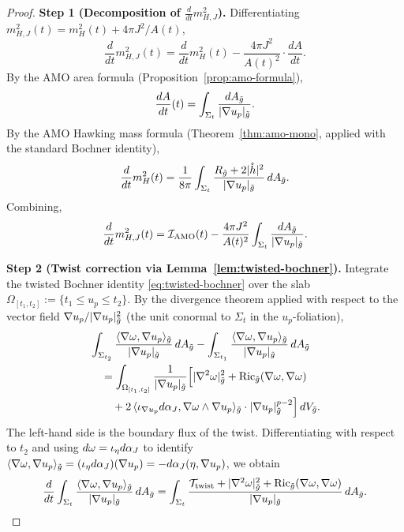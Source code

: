 \begin{proof}
\textbf{Step 1 (Decomposition of $\tfrac{d}{dt} m_{H,J}^2$).} Differentiating $m_{H,J}^2(t) = m_H^2(t) + 4\pi J^2/A(t)$,
\begin{equation}
\frac{d}{dt} m_{H,J}^2(t) = \frac{d}{dt} m_H^2(t) - \frac{4\pi J^2}{A(t)^2} \cdot \frac{dA}{dt}.
\end{equation}
By the AMO area formula (Proposition~\ref{prop:amo-formula}),
\begin{equation}
\frac{dA}{dt}(t) = \int_{\Sigma_t} \frac{dA_{\tilde{g}}}{|\nabla u_p|_{\tilde{g}}}.
\end{equation}
By the AMO Hawking mass formula (Theorem~\ref{thm:amo-mono}, applied with the standard Bochner identity),
\begin{equation}
\frac{d}{dt} m_H^2(t) = \frac{1}{8\pi}\int_{\Sigma_t} \frac{R_{\tilde{g}} + 2|\mathring{h}|^2}{|\nabla u_p|_{\tilde{g}}} \, dA_{\tilde{g}}.
\end{equation}
Combining,
\begin{equation}\label{eq:tbm-decomp}
\frac{d}{dt} m_{H,J}^2(t) = \mathcal{I}_{\mathrm{AMO}}(t) - \frac{4\pi J^2}{A(t)^2} \int_{\Sigma_t} \frac{dA_{\tilde{g}}}{|\nabla u_p|_{\tilde{g}}}.
\end{equation}

\textbf{Step 2 (Twist correction via Lemma~\ref{lem:twisted-bochner}).} Integrate the twisted Bochner identity \eqref{eq:twisted-bochner} over the slab $\Omega_{[t_1, t_2]} := \{t_1 \leq u_p \leq t_2\}$. By the divergence theorem applied with respect to the vector field $\nabla u_p / |\nabla u_p|_{\tilde{g}}^2$ (the unit conormal to $\Sigma_t$ in the $u_p$-foliation),
\begin{equation}\label{eq:tbm-slab}
\begin{aligned}
&\int_{\Sigma_{t_2}} \frac{\langle \nabla \omega, \nabla u_p\rangle_{\tilde{g}}}{|\nabla u_p|_{\tilde{g}}} \, dA_{\tilde{g}} - \int_{\Sigma_{t_1}} \frac{\langle \nabla \omega, \nabla u_p\rangle_{\tilde{g}}}{|\nabla u_p|_{\tilde{g}}} \, dA_{\tilde{g}} \\
&\quad = \int_{\Omega_{[t_1,t_2]}} \frac{1}{|\nabla u_p|_{\tilde{g}}} \Big[ |\nabla^2 \omega|_{\tilde{g}}^2 + \mathrm{Ric}_{\tilde{g}}(\nabla \omega, \nabla \omega) \\
&\qquad + 2\,\langle \iota_{\nabla u_p} d\alpha_J, \nabla \omega \wedge \nabla u_p \rangle_{\tilde{g}} \cdot |\nabla u_p|_{\tilde{g}}^{p-2} \Big] \, dV_{\tilde{g}}.
\end{aligned}
\end{equation}
The left-hand side is the boundary flux of the twist. Differentiating with respect to $t_2$ and using $d\omega = \iota_\eta d\alpha_J$ to identify $\langle \nabla \omega, \nabla u_p\rangle_{\tilde{g}} = (\iota_\eta d\alpha_J)(\nabla u_p) = -d\alpha_J(\eta, \nabla u_p)$, we obtain
\begin{equation}\label{eq:twist-flux}
\frac{d}{dt} \int_{\Sigma_t} \frac{\langle \nabla \omega, \nabla u_p\rangle_{\tilde{g}}}{|\nabla u_p|_{\tilde{g}}} \, dA_{\tilde{g}} = \int_{\Sigma_t} \frac{\mathcal{T}_{\mathrm{twist}} + |\nabla^2 \omega|_{\tilde{g}}^2 + \mathrm{Ric}_{\tilde{g}}(\nabla \omega, \nabla \omega)}{|\nabla u_p|_{\tilde{g}}} \, dA_{\tilde{g}}.
\end{equation}


\end{proof}

